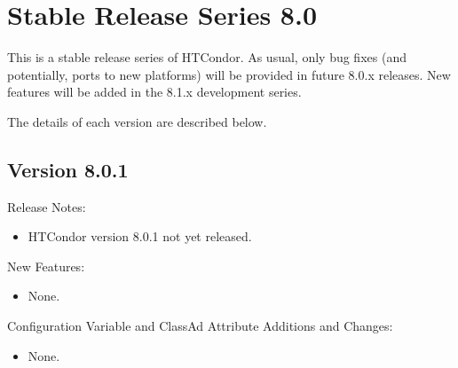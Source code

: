 
\section{\label{sec:History-8-0}Stable Release Series 8.0}

This is a stable release series of HTCondor.
As usual, only bug fixes (and potentially, ports to new platforms)
will be provided in future 8.0.x releases.
New features will be added in the 8.1.x development series.

The details of each version are described below.

\subsection*{\label{sec:New-8-0-1}Version 8.0.1}

\noindent Release Notes:

\begin{itemize}

\item HTCondor version 8.0.1 not yet released.

\end{itemize}


\noindent New Features:

\begin{itemize}

\item None.

\end{itemize}

\noindent Configuration Variable and ClassAd Attribute Additions and Changes:

\begin{itemize}

\item None.

\end{itemize}

